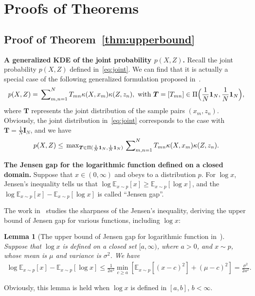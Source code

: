 \documentclass{article}
\newtheorem{lemma}{Lemma}
\begin{document}


\newpage
\appendix

\section{Proofs of Theorems}\label{appendix:thm}
\subsection{Proof of Theorem~\ref{thm:upperbound}}\label{appendix:thm}

\textbf{A generalized KDE of the joint probability $p(X,Z)$.}
Recall the joint probability $p(X,Z)$ defined in~\eqref{eq:joint}. 
We can find that it is actually a special case of the following generalized formulation proposed in~\cite{chuang2023infoot}.
\begin{eqnarray}\label{eq:infoot}
    p(X,Z)=\sideset{}{_{m,n=1}^{N}}\sum T_{mn}\kappa(X,x_m)\kappa(Z,z_n),~\text{with}~\bm{T}=[T_{mn}]\in\Pi\Bigl(\frac{1}{N}\bm{1}_N,\frac{1}{N}\bm{1}_N\Bigr),
\end{eqnarray}
where $\bm{T}$ represents the joint distribution of the sample pairs $(x_m,z_n)$.
Obviously, the joint distribution in~\eqref{eq:joint} corresponds to the case with $\bm{T}=\frac{1}{N}\bm{I}_N$, and we have
\begin{eqnarray}\label{eq:general_kde}
    p(X,Z)\leq \sideset{}{_{\bm{T}\in\Pi(\frac{1}{N}\bm{1}_N,\frac{1}{N}\bm{1}_N)}}\max \sideset{}{_{m,n=1}^{N}}\sum T_{mn}\kappa(X,x_m)\kappa(Z,z_n).
\end{eqnarray}

\textbf{The Jensen gap for the logarithmic function defined on a closed domain.}
Suppose that $x\in (0,\infty)$ and obeys to a distribution $p$.
For $\log x$, Jensen's inequality tells us that  $\log\mathbb{E}_{x\sim p}[x]\geq \mathbb{E}_{x\sim p}[\log x]$, and the $\log\mathbb{E}_{x\sim p}[x]-\mathbb{E}_{x\sim p}[\log x]$ is called ``Jensen gap''. 

The work in~\cite{costarelli2015sharp} studies the sharpness of the Jensen's inequality, deriving the upper bound of Jensen gap for various functions, including $\log x$:
\begin{lemma}[The upper bound of Jensen gap for logarithmic function in~\cite{costarelli2015sharp}]\label{lemma:gap}
Suppose that $\log x$ is defined on a closed set $[a,\infty)$, where $a>0$, and $x\sim p$, whose mean is $\mu$ and variance is $\sigma^2$. 
We have
\begin{eqnarray}\label{eq:gap}
    \log\mathbb{E}_{x\sim p}[x]-\mathbb{E}_{x\sim p}[\log x]\leq\frac{1}{2a^2}\min_{c\geq a}[\mathbb{E}_{x\sim p}[(x-c)^2]+(\mu-c)^2]=\frac{\sigma^2}{2a^2}. 
\end{eqnarray}
\end{lemma}
Obviously, this lemma is held when $\log x$ is defined in $[a, b]$, $b<\infty$. 
\end{document}
